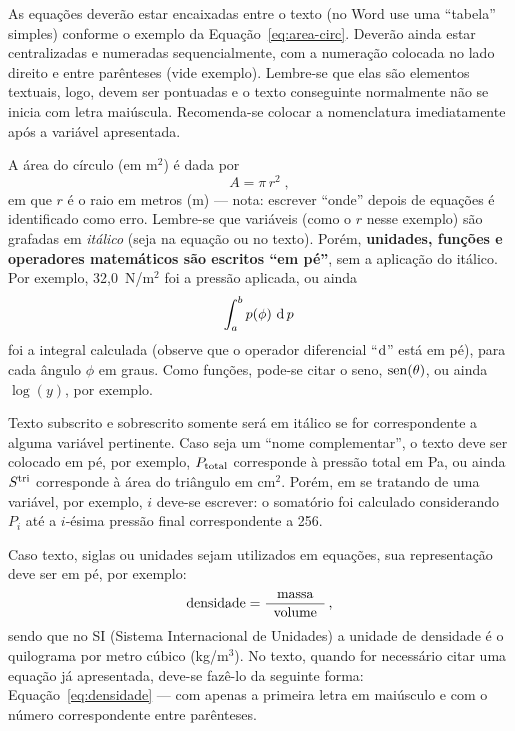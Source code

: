 As equações deverão estar encaixadas entre o texto (no Word use uma ``tabela'' simples) conforme o exemplo da Equação~\eqref{eq:area-circ}. Deverão ainda estar centralizadas e numeradas sequencialmente, com a numeração colocada no lado direito e entre parênteses (vide exemplo). Lembre-se que elas são elementos textuais, logo, devem ser pontuadas e o texto conseguinte normalmente não se inicia com letra maiúscula. Recomenda-se colocar a nomenclatura imediatamente após a variável apresentada.

A área do círculo (em m$^2$) é dada por 
\begin{equation}
	A = \pi \, r^2\;,
\label{eq:area-circ}
\end{equation}
%
em que $r$ é o raio em metros (m) --- nota: escrever ``onde'' depois de equações é identificado como erro. Lembre-se que variáveis (como o $r$ nesse exemplo) são grafadas em \textit{itálico} (seja na equação ou no texto). Porém, \textbf{unidades, funções e operadores matemáticos são escritos ``em pé''}, sem a aplicação do itálico. Por exemplo, 32,0~N/m$^2$ foi a pressão aplicada, ou ainda
%
\begin{equation}
	\int_a^b p(\phi)\, \operatorname{d} p\,
\label{eq:int}
\end{equation}
%
foi a integral calculada (observe que o operador diferencial ``$\text{d}$'' está em pé), para cada ângulo $\phi$ em graus. Como funções, pode-se citar o seno, $\operatorname{sen}(\theta)$, ou ainda $\log(y)$, por exemplo. 
%

Texto subscrito e sobrescrito somente será em itálico se for correspondente a alguma variável pertinente. Caso seja um ``nome complementar'', o texto deve ser colocado em pé, por exemplo, $P_{\text{total}}$ corresponde à pressão total em Pa, ou ainda $S^{\text{tri}}$ corresponde à área do triângulo em cm$^2$. Porém, em se tratando de uma variável, por exemplo, $i$ deve-se escrever: o somatório foi calculado considerando $P_i$ até a $i$-ésima pressão final correspondente a 256.

Caso texto, siglas ou unidades sejam utilizados em equações, sua representação deve ser em pé, por exemplo:
%
\begin{equation}
	\text{densidade} = \frac{\text{massa}}{\;\;\text{volume}\;\;}\,,
\label{eq:densidade}
\end{equation}
%
sendo que no SI (Sistema Internacional de Unidades) a unidade de densidade é o quilograma por metro cúbico (kg/m$^3$).
%
No texto, quando for necessário citar uma equação já apresentada, deve-se fazê-lo da seguinte forma: Equação~\eqref{eq:densidade} --- com apenas a primeira letra em maiúsculo e com o número correspondente entre parênteses.

